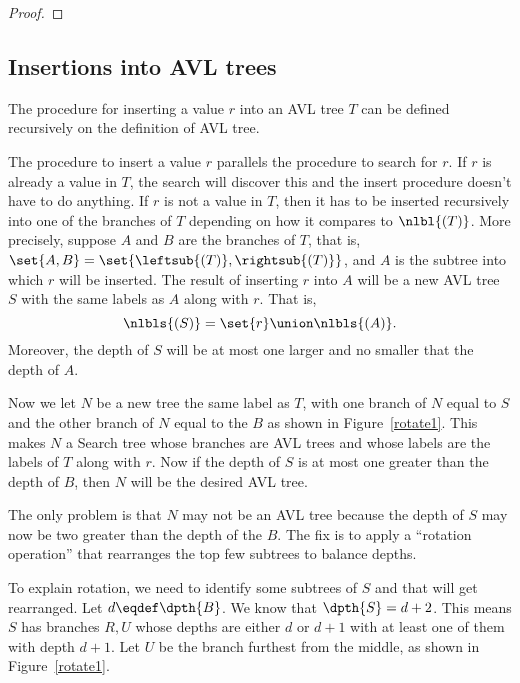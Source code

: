 \begin{definition}
\begin{proof}

\end{proof}
\fi

\subsection{Insertions into AVL trees}
The procedure for inserting a value $r$ into an AVL tree $T$ can be
defined recursively on the definition of AVL tree.  

\iffalse
The other technicality comes about because we will be taking a tree
and defining a new tree sharing some of its subtrees.  To avoid
sharing in the new tree, the recursive definition we will need trees
that are combinations of subtrees trees using subtrees of

The insertion procedure is usually described as a process of
rearranging the ``links'' that hold $T$ together.
\fi

The procedure to insert a value $r$ parallels the procedure to search
for $r$.  If $r$ is already a value in $T$, the search will discover
this and the insert procedure doesn't have to do anything.  If $r$ is
not a value in $T$, then it has to be inserted recursively into one of
the branches of $T$ depending on how it compares to $\nlbl{(T)}$.
More precisely, suppose $A$ and $B$ are the branches of $T$, that is,
$\set{A,B}= \set{\leftsub{(T)}, \rightsub{(T)}}$, and $A$ is the
subtree into which $r$ will be inserted.  The result of inserting $r$
into $A$ will be a new AVL tree $S$ with the same labels as $A$ along
with $r$.  That is,
\[
\nlbls{(S)} = \set{r} \union \nlbls{(A)}.
\]
Moreover, the depth of $S$ will be at most one larger and no smaller
that the depth of $A$.

Now we let $N$ be a new tree the same label as $T$, with one branch of
$N$ equal to $S$ and the other branch of $N$ equal to the $B$ as shown
in Figure~\ref{rotate1}.  This makes $N$ a Search tree whose branches
are AVL trees and whose labels are the labels of $T$ along with $r$.
Now if the depth of $S$ is at most one greater than the depth of $B$,
then $N$ will be the desired AVL tree.

The only problem is that $N$ may not be an AVL tree because the depth
of $S$ may now be two greater than the depth of the $B$.  The fix is
to apply a ``rotation operation'' that rearranges the top few subtrees
to balance depths.

To explain rotation, we need to identify some subtrees of $S$ and that
will get rearranged.  Let $d \eqdef \dpth{B}$.  We know that $\dpth{S}
= d+2$.  This means $S$ has branches $R,U$ whose depths are either $d$
or $d+1$ with at least one of them with depth $d+1$.  Let $U$ be the
branch furthest from the middle, as shown in Figure~\ref{rotate1}.


\end{definition}
